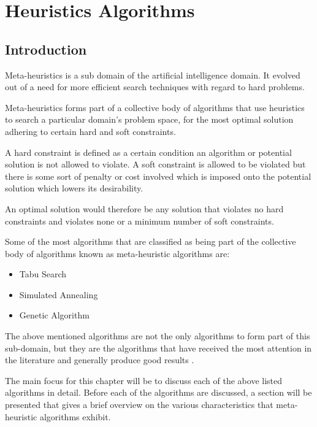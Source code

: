 \chapter{Heuristics Algorithms}
\section{Introduction}
Meta-heuristics is a sub domain of the artificial intelligence domain. It evolved out of a need for more efficient search techniques with regard to hard problems. 

Meta-heuristics forms part of a collective body of algorithms that use heuristics to search a particular domain's problem space, for the most optimal solution adhering to certain hard and soft constraints\cite{AIModernApproach,NatureInspiredMetaHeuristic}. 

A hard constraint is defined as a certain condition an algorithm or potential solution is not allowed to violate\cite{AIModernApproach,NatureInspiredMetaHeuristic,Karen2004,Eisenblatter}. A soft constraint is allowed to be violated but there is some sort of penalty or cost involved which is imposed onto the potential solution which lowers its desirability\cite{AIModernApproach,NatureInspiredMetaHeuristic,Karen2004,Eisenblatter}. 

An optimal solution would therefore be any solution that violates no hard constraints and violates none or a minimum number of soft constraints\cite{AIModernApproach,NatureInspiredMetaHeuristic,Karen2004,Eisenblatter}.

Some of the most algorithms that are classified as being part of the collective body of algorithms known as meta-heuristic algorithms are:
\begin{itemize}
\item Tabu Search
\item Simulated Annealing
\item Genetic Algorithm
\end{itemize}
The above mentioned algorithms are not the only algorithms to form part of this sub-domain, but they are the algorithms that have received the most attention in the literature and generally produce good results \cite{SweepMeta}.

The main focus for this chapter will be to discuss each of the above listed algorithms in detail. Before each of the algorithms are discussed, a section will be presented that gives a brief overview on the various characteristics that meta-heuristic algorithms exhibit. 

